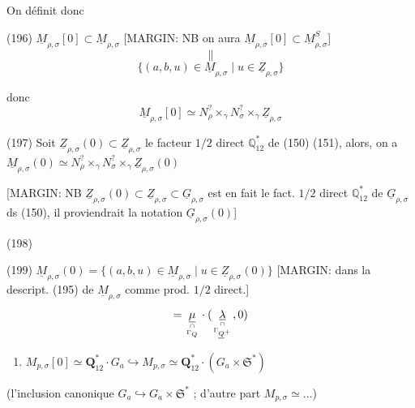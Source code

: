 On définit donc

(196) $\underline{M}_{\rho, \sigma}[0] \subset \underline{M}_{\rho, \sigma}$
[MARGIN: NB on aura $\underline{M}_{\rho, \sigma}[0] \subset \underline{M}_{\rho, \sigma}^S$]
$$ \| $$
$$ \{(a, b, u) \in \underline{M}_{\rho, \sigma} \mid u \in \underline{Z}_{\rho, \sigma}\} $$

donc
$$ \underline{M}_{\rho, \sigma}[0] \simeq N_\rho^? \times_\gamma N_\sigma^? \times_\gamma \underline{Z}_{\rho, \sigma} $$

(197) Soit $\underline{Z}_{\rho, \sigma}(0) \subset \underline{Z}_{\rho, \sigma}$
le facteur $1/2$ direct $\mathbb{Q}_{12}^*$ de (150) (151),
alors, on a $\underline{M}_{\rho, \sigma}(0) \simeq N_\rho^? \times_\gamma N_\sigma^? \times_\gamma \underline{Z}_{\rho, \sigma}(0)$

[MARGIN: NB $\underline{Z}_{\rho, \sigma}(0) \subset \underline{Z}_{\rho, \sigma} \subset \underline{G}_{\rho, \sigma}$ est en fait le fact. $1/2$ direct $\mathbb{Q}_{12}^*$ de $\underline{G}_{\rho, \sigma}$ ds (150), il proviendrait la notation $\underline{G}_{\rho, \sigma}(0)$]

(198)

(199) $\underline{M}_{\rho, \sigma}(0) = \{(a, b, u) \in \underline{M}_{\rho, \sigma} \mid u \in \underline{Z}_{\rho, \sigma}(0)\}$
[MARGIN: dans la descript. (195) de $\underline{M}_{\rho, \sigma}$ comme prod. $1/2$ direct.]
$$ = \underset{\cap \atop \Gamma_Q}{\underline{\mu}} \cdot ( \underset{\cap \atop \Gamma_{\underline{Q}^+}}{\underline{\lambda}} , 0 ) $$

\newpage



\begin{enumerate}
\item[200)] $M_{p, \sigma} [0] \simeq \mathbf{Q}_{12}^* \cdot G_a \hookrightarrow M_{p, \sigma} \simeq \mathbf{Q}_{12}^* \cdot (G_a \times \mathfrak{S}^*)$
\end{enumerate}
(l'inclusion canonique $G_a \hookrightarrow G_a \times \mathfrak{S}^*$ ; d'autre part $M_{p, \sigma} \simeq \dots$)

